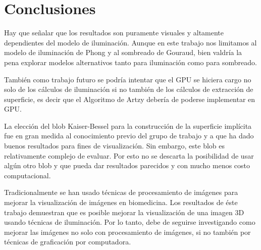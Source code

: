 \chapter*{Conclusiones}

Hay que señalar que los resultados son puramente visuales y altamente dependientes del modelo de iluminación. Aunque en este trabajo nos limitamos al modelo de iluminación de Phong y al sombreado de Gouraud, bien valdría la pena explorar modelos alternativos tanto para iluminación como para sombreado.

También como trabajo futuro se podría intentar que el GPU se hiciera cargo no solo de los cálculos de iluminación si no también de los cálculos de extracción de superficie, es decir que el Algoritmo de Artzy debería de poderse implementar en GPU.

La elección del blob Kaiser-Bessel para la construcción de la superficie implícita fue en gran medida al conocimiento previo del grupo de trabajo y a que ha dado buenos resultados para fines de visualización. Sin embargo, este blob es relativamente complejo de evaluar. Por esto no se descarta la posibilidad de usar algún otro blob y que pueda dar resultados parecidos y con mucho menos costo computacional.

Tradicionalmente se han usado técnicas de procesamiento de imágenes para mejorar la visualización de imágenes en biomedicina. Los resultados de éste trabajo demuestran que es posible mejorar la visualización de una imagen 3D usando técnicas de iluminación. Por lo tanto, debe de seguirse investigando como mejorar las imágenes  no solo con procesamiento de imágenes, si no también por técnicas de graficación por computadora. 
